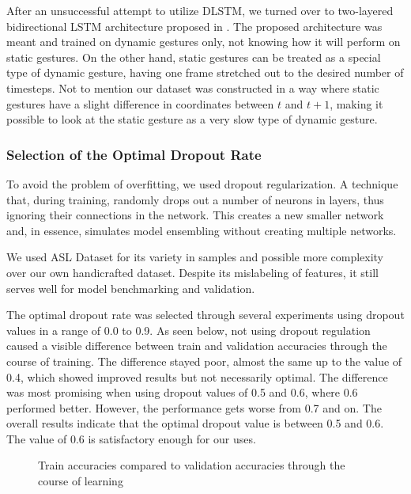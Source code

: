 After an unsuccessful attempt to utilize DLSTM, we turned over to two-layered bidirectional LSTM architecture proposed in \cite{bidirect_dynam}. The proposed architecture was meant and trained on dynamic gestures only, not knowing how it will perform on static gestures. On the other hand, static gestures can be treated as a special type of dynamic gesture, having one frame stretched out to the desired number of timesteps. Not to mention our dataset was constructed in a way where static gestures have a slight difference in coordinates between $t$ and $t+1$, making it possible to look at the static gesture as a very slow type of dynamic gesture.

\subsubsection{Selection of the Optimal Dropout Rate}

To avoid the problem of overfitting, we used dropout regularization. 
A technique that, during training, randomly drops out a number of neurons in layers, thus ignoring their connections in the network. This creates a new smaller network and, in essence, simulates model ensembling without creating multiple networks.

We used ASL Dataset for its variety in samples and possible more complexity over our own handicrafted dataset. Despite its mislabeling of features, it still serves well for model benchmarking and validation.

The optimal dropout rate was selected through several experiments using dropout values in a range of 0.0 to 0.9. As seen below, not using dropout regulation caused a visible difference between train and validation accuracies through the course of training. The difference stayed poor, almost the same up to the value of 0.4, which showed improved results but not necessarily optimal. The difference was most promising when using dropout values of 0.5 and 0.6, where 0.6 performed better. However, the performance gets worse from 0.7 and on. The overall results indicate that the optimal dropout value is between 0.5 and 0.6. The value of 0.6 is satisfactory enough for our uses.

\begin{figure}[h]
	\centering
    \qquad
    \caption{Train accuracies compared to validation accuracies through the course of learning}
\end{figure}

